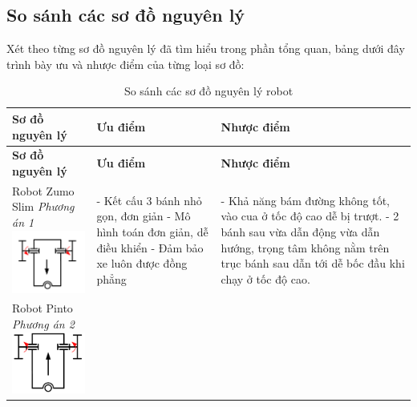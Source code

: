         \subsection{So sánh các sơ đồ nguyên lý}
            \hspace*{0.6cm}Xét theo từng sơ đồ nguyên lý đã tìm hiểu trong phần tổng quan, bảng dưới đây 
                            trình bày ưu và nhược điểm của từng loại sơ đồ:
            \begin{longtable}{|p{4cm}|p{5cm}|p{5cm}|}
                \caption{So sánh các sơ đồ nguyên lý robot} 
                \label{tab:compare_robot_schemes} \\ 
                \hline
                \textbf{Sơ đồ nguyên lý} & \textbf{Ưu điểm} & \textbf{Nhược điểm} \\
                \hline
                \endfirsthead
                \hline
                \textbf{Sơ đồ nguyên lý} & \textbf{Ưu điểm} & \textbf{Nhược điểm} \\
                \hline
                \endhead
                \hline
                \endfoot
                \hline
                \endlastfoot
                Robot Zumo Slim \newline
                \textit{Phương án 1} \newline
                \includegraphics[width=3cm]{pictures/chapter2/chapter2_pic_1.png} & 
                - Kết cấu 3 bánh nhỏ gọn, đơn giản \newline
                - Mô hình toán đơn giản, dễ điều khiển \newline
                - Đảm bảo xe luôn được đồng phẳng & 
                - Khả năng bám đường không tốt, vào cua ở tốc độ cao dễ bị trượt. \newline
                - 2 bánh sau vừa dẫn động vừa dẫn hướng, trọng tâm không nằm trên trục bánh sau dẫn tới dễ bốc đầu khi chạy ở tốc độ cao. \\
                \hline
                Robot Pinto \newline
                \textit{Phương án 2} \newline
                \includegraphics[width=3cm]{pictures/chapter2/chapter2_pic_2.png} & 

\end{longtable}
